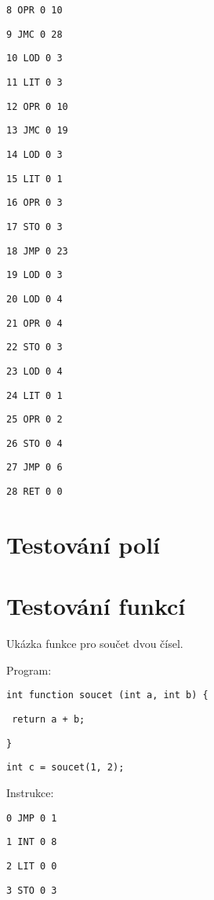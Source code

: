 \documentclass[czech]{thesiskiv}
\begin{document}
\texttt{8	OPR	0	10      }

\texttt{9	JMC	0	28       }

\texttt{10	LOD	0	3       }

\texttt{11	LIT	0	3        }

\texttt{12	OPR	0	10        }

\texttt{13	JMC	0	19         }

\texttt{14	LOD	0	3           }

\texttt{15	LIT	0	1 }

\texttt{16	OPR	0	3  }

\texttt{17	STO	0	3   }

\texttt{18	JMP	0	23   }

\texttt{19	LOD	0	3     }

\texttt{20	LOD	0	4      }

\texttt{21	OPR	0	4       }

\texttt{22	STO	0	3        }

\texttt{23	LOD	0	4         }

\texttt{24	LIT	0	1          }

\texttt{25	OPR	0	2           }

\texttt{26	STO	0	4            }

\texttt{27	JMP	0	6             }

\texttt{28	RET	0	0              }


\section{Testování polí}

\section{Testování funkcí}
Ukázka funkce pro součet dvou čísel.

\noindent Program:

\texttt{int function soucet (int a, int b) \{}
 
\texttt{    return a + b;}

\texttt{\} }

\texttt{int c = soucet(1, 2); }

\noindent Instrukce: 

\texttt{0	JMP	0	1              }

\texttt{1	INT	0	8              }

\texttt{2	LIT	0	0             }

\texttt{3	STO	0	3            }
\end{document}
